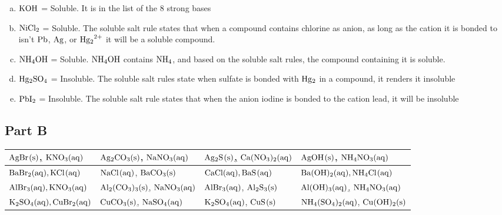 \documentclass{scrartcl}
\begin{document}
\begin{enumerate}[a.]
\item \(\ce{KOH}\) = Soluble. It is in the list of the 8 strong bases
\item \(\ce{NiCl2}\) = Soluble. The soluble salt rule states that when a compound
contains chlorine as anion, as long as the cation it is bonded to isn't
\(\ce{Pb}\),     \(\ce{Ag}\), or \(\ce{Hg2^{2+}}\) it will be a soluble
compound.
\item \(\ce{NH4OH}\) = Soluble. \(\ce{NH4OH}\) contains \(\ce{NH4}\), and based on
the soluble salt rules, the compound containing it is soluble.
\item \(\ce{Hg2SO4}\) = Insoluble. The soluble salt rules state when sulfate is
bonded with     \(\ce{Hg2}\) in a compound, it renders it insoluble
\item \(\ce{PbI2}\) = Insoluble. The soluble salt rule states that when the anion
iodine is bonded to the cation lead, it will be insoluble
\end{enumerate}

\subsection{Part B}
\label{sec:orgaad9774}
\begin{center}
\begin{tabular}{llll}
\toprule
\uline{\(\ce{AgBr(s)}\),} \(\ce{KNO3(aq)}\) & \uline{\(\ce{Ag2CO3(s)}\)}, \(\ce{NaNO3(aq)}\) & \uline{\(\ce{Ag2S(s)}\),}  \(\ce{Ca(NO3)2(aq)}\) & \uline{\(\ce{AgOH(s)}\)}, \(\ce{NH4NO3(aq)}\)\\
\midrule
\(\ce{BaBr2(aq), KCl(aq)}\) & \(\ce{NaCl(aq)}\), \uline{\(\ce{BaCO3(s)}\)} & \(\ce{CaCl(aq), BaS(aq)}\) & \(\ce{Ba(OH)2(aq), NH4Cl(aq)}\)\\
\midrule
\(\ce{AlBr3(aq), KNO3(aq)}\) & \uline{\(\ce{Al2(CO3)3(s)}\),} \(\ce{NaNO3(aq)}\) & \(\ce{AlBr3(aq)}\), \uline{\(\ce{Al2S3(s)}\)} & \uline{\(\ce{Al(OH)3(aq)}\),} \(\ce{NH4NO3(aq)}\)\\
\midrule
\(\ce{K2SO4(aq), CuBr2(aq)}\) & \uline{\(\ce{CuCO3(s)}\),} \(\ce{NaSO4(aq)}\) & \(\ce{K2SO4(aq)}\), \uline{\(\ce{CuS(s)}\)} & \(\ce{NH4(SO4)2(aq)}\), \uline{\(\ce{Cu(OH)2(s)}\)}\\
\bottomrule
\end{tabular}
\end{center}
\end{document}
